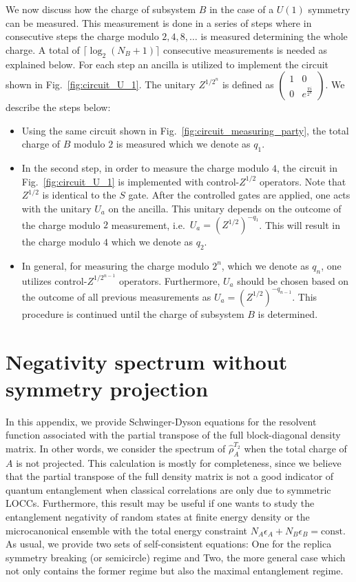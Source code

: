 \documentclass[aps,pra,reprint,superscriptaddress,twocolumn,notitlepage]{revtex4-1}
\numberwithin{equation}{section}
\renewcommand\theequation{\arabic{section}.\arabic{equation}}
\begin{document}
We now discuss how the charge of subsystem $B$ in the case of a $U(1)$ symmetry can be measured. This measurement is done in a series of steps where in consecutive steps the charge modulo $2, 4, 8, \ldots$ is measured determining the whole charge. A total of $\lceil \log_2 (N_B + 1) \rceil$ consecutive measurements is needed as explained below.
For each step an ancilla is utilized to implement the circuit shown in Fig.~\ref{fig:circuit_U_1}. The unitary $Z^{1/2^n}$ is defined as 
$\begin{pmatrix}
1 & 0 \\
0 & e^{\frac{\pi i}{2^n}}
\end{pmatrix}$.
We describe the steps below:
\begin{itemize}
    \item Using the same circuit shown in Fig.~\ref{fig:circuit_measuring_party}, the total charge of $B$ modulo $2$ is measured which we denote as $q_1$.
    \item In the second step, in order to measure the charge modulo $4$, the circuit in Fig.~\ref{fig:circuit_U_1} is implemented with control-$Z^{1/2}$ operators. Note that $Z^{1/2}$ is identical to the $S$ gate. After the controlled gates are applied, one acts with the unitary $U_a$ on the ancilla. This unitary depends on the outcome of the charge modulo $2$ measurement, i.e.~$U_a = (Z^{1/2})^{- q_1}$. This will result in the charge modulo $4$ which we denote as $q_2$.
    \item In general, for measuring the charge modulo $2^n$, which we denote as $q_n$, one utilizes control-$Z^{1/2^{n-1}}$ operators. Furthermore, $U_a$ should be chosen based on the outcome of all previous measurements as $U_a = (Z^{1/2})^{- q_{n-1} }$. This procedure is continued until the charge of subsystem $B$ is determined.
\end{itemize}

\section{Negativity spectrum without symmetry projection}
\label{app:unprojected}

\renewcommand\theequation{E\arabic{equation}}

In this appendix, we provide Schwinger-Dyson equations for the resolvent function associated with the partial transpose of the full block-diagonal density matrix. 
In other words, we consider the spectrum of $\hat\rho_A^{T_2}$ when the total charge of $A$ is not projected.
This calculation is mostly for completeness, since we believe that the partial transpose of the full density matrix is not a good indicator of quantum entanglement when classical correlations are only due to symmetric LOCCs. Furthermore, this result may be useful if one wants to study the entanglement negativity of random states at finite energy density or the microcanonical ensemble with the total energy constraint $N_{A} \epsilon_A + N_B \epsilon_B = \text{const}$. As usual, we provide two sets of self-consistent equations: One for the replica symmetry breaking (or semicircle) regime and Two, the more general case which not only contains the former regime but also the maximal entanglement regime.
\end{document}
